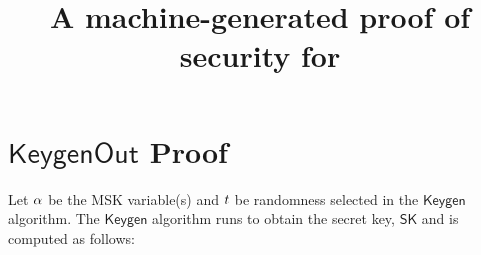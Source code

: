 \documentclass[11pt]{article}
\begin{document}


\newtheorem{definition}{Definition}
\newtheorem{theorem}{Theorem}
\newcommand{\Oracle}{\mathcal{O}}
\newcommand{\Adv}{\mathcal{A}}
\newcommand{\Bdv}{\mathcal{B}}
\newcommand{\MS}{\mathcal{M}}
\newcommand{\Psetup}{\mathsf{PSetup}}
\newcommand{\Msetup}{\mathsf{Setup}}
\newcommand{\params}{\mathit{params}}
\newcommand{\brk}[1]{\langle #1 \rangle}
\newcommand{\ait}[1]{#1}
\newcommand{\Ga}{\ait{\mathbb{G}}_1}
\newcommand{\ga}{\ait{g}_1}
\newcommand{\ha}{\ait{h}_1}
\newcommand{\poly}{\mathrm{poly}}

\newcommand{\bit}[1]{#1}
\newcommand{\Gb}{\bit{\mathbb{G}}_2}
\newcommand{\gb}{\bit{g}_2}
\newcommand{\hb}{\bit{h}_2}

\newcommand{\cit}[1]{#1}
\newcommand{\Gc}{\cit{\Group_T}}
\newcommand{\gc}{\cit{g}}
\newcommand{\hc}{\cit{h}}
\newcommand{\Zp}{\mathbb{Z}_p}

\newcommand{\Group}{\ensuremath{\mathbb{G}}\xspace}
\newcommand{\Hroup}{\ensuremath{\mathbb{H}}\xspace}
\newcommand{\map}{\mathbf{e}}

\newcommand{\prot}{\mathsf{Prot}}
\newcommand{\auxext}{\mathit{auxext}}
\newcommand{\auxsim}{\mathit{auxsim}}
\newcommand{\aux}{\mathit{aux}}
\newcommand{\state}{\mathit{state}}
\newcommand{\Alg}{\mathsf{Alg}}
\newcommand{\A}{\mathcal{A}}

\newcommand{\Sig}{\mathsf{Sig}}
\newcommand{\G}{\mathsf{Gen}}
\newcommand{\SK}{\mathsf{SK}}
\newcommand{\Screen}{\mathsf{Screen}}
\newcommand{\Setup}{\mathsf{Setup}}
\newcommand{\Keygen}{\mathsf{Keygen}}
\newcommand{\KeygenOut}{\mathsf{KeygenOut}}
\newcommand{\Transform}{\mathsf{Transform}}
\newcommand{\Decrypt}{\mathsf{Decrypt}}
\newcommand{\compareequals}{\stackrel{?}{=}}
\newcommand{\numsigs}{\eta}

\title{A machine-generated proof of security for {\schemename}}
\author{}
\date{}
\maketitle

\section{$\KeygenOut$ Proof}

Let $\alpha$ be the MSK variable(s) and $t$ be randomness selected in the $\Keygen$ algorithm. The $\Keygen$ algorithm runs to obtain the secret key, $\SK$ and is computed as follows:
\end{document}
